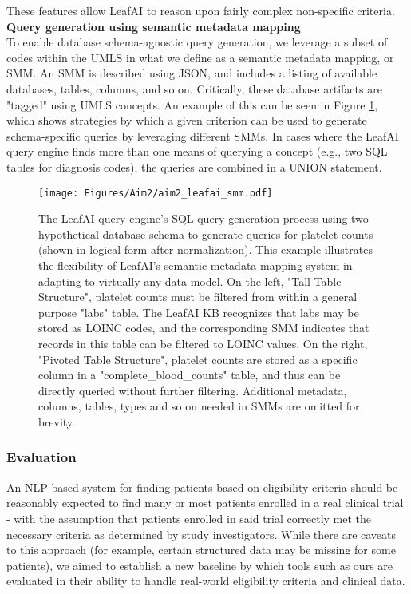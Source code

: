\documentclass[../main.tex]{subfiles}
\begin{document}
\noindent These features allow LeafAI to reason upon fairly complex non-specific criteria. \\

\noindent \textbf{Query generation using semantic metadata mapping} \\
To enable database schema-agnostic query generation, we leverage a subset of codes within the UMLS in what we define as a semantic metadata mapping, or SMM. An SMM is described using JSON, and includes a listing of available databases, tables, columns, and so on. Critically, these database artifacts are "tagged" using UMLS concepts. An example of this can be seen in Figure \ref{aim2_fig_leafai_smm}, which shows strategies by which a given criterion can be used to generate schema-specific queries by leveraging different SMMs. In cases where the LeafAI query engine finds more than one means of querying a concept (e.g., two SQL tables for diagnosis codes), the queries are combined in a UNION statement.

\begin{figure}[h!]
  \texttt{[image: Figures/Aim2/aim2\_leafai\_smm.pdf]}  
\caption{The LeafAI query engine's SQL query generation process using two hypothetical database schema to generate queries for platelet counts (shown in logical form after normalization). This example illustrates the flexibility of LeafAI's semantic metadata mapping system in adapting to virtually any data model. On the left, "Tall Table Structure", platelet counts must be filtered from within a general purpose "labs" table. The LeafAI KB recognizes that labs may be stored as LOINC codes, and the corresponding SMM indicates that records in this table can be filtered to LOINC values. On the right, "Pivoted Table Structure", platelet counts are stored as a specific column in a "complete\_blood\_counts" table, and thus can be directly queried without further filtering. Additional metadata, columns, tables, types and so on needed in SMMs are omitted for brevity.}
\label{aim2_fig_leafai_smm}
\end{figure}

\subsubsection{Evaluation}
An NLP-based system for finding patients based on eligibility criteria should be reasonably expected to find many or most patients enrolled in a real clinical trial - with the assumption that patients enrolled in said trial correctly met the necessary criteria as determined by study investigators. While there are caveats to this approach (for example, certain structured data may be missing for some patients), we aimed to establish a new baseline by which tools such as ours are evaluated in their ability to handle real-world eligibility criteria and clinical data.
\end{document}

